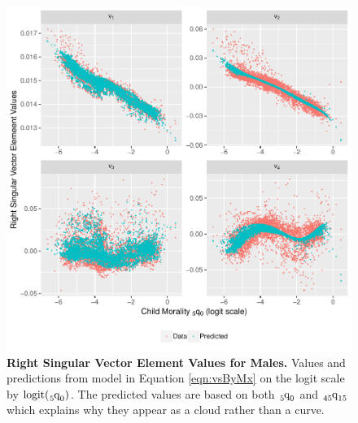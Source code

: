 \documentclass[11pt]{article}
\newcommand{\qf}{\tensor*[_5]{\mbox{q}}{_0}}
\newcommand{\qff}{\tensor*[_{45}]{\mbox{q}}{_{15}}}
\newcommand{\logit}{\mbox{logit}}
\begin{document}
\begin{appendices}
\begin{figure}[htbp]
   \centering
   \includegraphics[width=0.94\linewidth]{../figures/fig2-1m.pdf} 
   \captionsetup{format=plain,font=normalsize,margin=0cm,justification=justified}
   \caption{\textbf{Right Singular Vector Element Values for Males.} Values and predictions from model in Equation \ref{eqn:vsByMx} on the logit scale by $\logit(\qf)$.  The predicted values are based on both $\qf$ and $\qff$ which explains why they appear as a cloud rather than a curve.}
   \label{fig:rsvM}
\end{figure}


\end{appendices}
\end{document}
